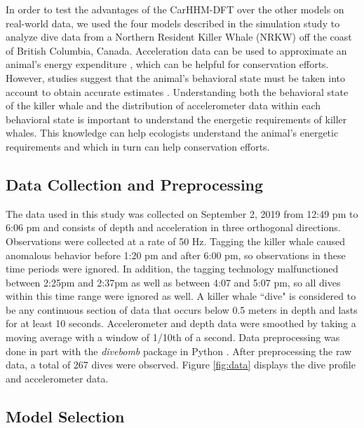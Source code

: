 

In order to test the advantages of the CarHHM-DFT over the other models on real-world data, we used the four models described in the simulation study to analyze dive data from a Northern Resident Killer Whale (NRKW) off the coast of British Columbia, Canada. Acceleration data can be used to approximate an animal's energy expenditure \citep{Green:2009,Wilson:2019}, which can be helpful for conservation efforts. However, studies suggest that the animal's behavioral state must be taken into account to obtain accurate estimates \citep{Dot:2016}. Understanding both the behavioral state of the killer whale and the distribution of accelerometer data within each behavioral state is important to understand the energetic requirements of killer whales. This knowledge can help ecologists understand the animal's energetic requirements and which in turn can help conservation efforts.

\subsection{Data Collection and Preprocessing}

The data used in this study was collected on September 2, 2019 from 12:49 pm to 6:06 pm and consists of depth and acceleration in three orthogonal directions. Observations were collected at a rate of 50 Hz. Tagging the killer whale caused anomalous behavior before 1:20 pm and after 6:00 pm, so observations in these time periods were ignored. In addition, the tagging technology malfunctioned between 2:25pm and 2:37pm as well as between 4:07 and 5:07 pm, so all dives within this time range were ignored as well. A killer whale ``dive" is considered to be any continuous section of data that occurs below 0.5 meters in depth and lasts for at least 10 seconds. Accelerometer and depth data were smoothed by taking a moving average with a window of 1/10th of a second. Data preprocessing was done in part with the \textit{divebomb} package in Python \citep{Nunes:2018}. After preprocessing the raw data, a total of 267 dives were observed. Figure \ref{fig:data} displays the dive profile and accelerometer data.

\subsection{Model Selection}

